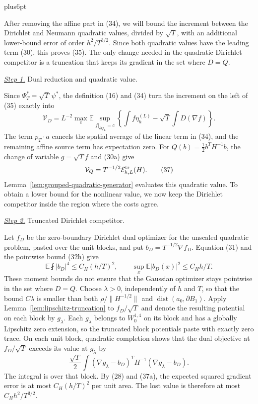\documentclass[11pt,reqno]{amsart}
\makeatletter
\theoremstyle{plain}
\theoremstyle{definition}
\theoremstyle{remark}
\renewenvironment{proof}[1][\proofname]{%
  \par
  \pushQED{\qed}%
  \normalfont
  \topsep6pt plus6pt\relax
  \trivlist
  \item[\hskip\labelsep\slshape #1\@addpunct{.}]%
  \ignorespaces
}{%
  \popQED
  \endtrivlist
  \@endpefalse
}
\DeclareRobustCommand{\qed}{%
  \leavevmode\unskip\penalty9999\hbox{}\nobreak
  \ifmmode
    \makebox[0pt][l]{\qquad\hbox{\qedsymbol}}%
  \else
    \qquad\hbox{\qedsymbol}%
  \fi
}
\renewcommand{\qedsymbol}{\rule[.47pt]{4pt}{6pt}}
\numberwithin{equation}{section}
\newcommand{\1}{\mathbf 1}
\makeatother
\begin{document}
\begin{proof}
After removing the affine part in (34), we will bound the increment
between the Dirichlet and Neumann quadratic values, divided by
$\sqrt T$, with an additional lower-bound error of order
$h^2/T^{3/2}$.  Since both quadratic values have the leading term
(30), this proves (35).  The only change needed in the quadratic
Dirichlet competitor is a truncation that keeps its gradient in the
set where $D=Q$.

\smallskip\noindent
\underline{\textit{Step 1.}} Dual reduction and quadratic value.

Since $\Psi_ T^*=\sqrt T\,\psi^*$, the definition (16) and (34) turn
the increment on the left of (35) exactly into
\begin{equation}
\mathcal V_ D=L^{-2}\max_ c\mathbb E\sup_ {f|_ {\partial Q_ L}=c}
\left\{\int f\eta_ h^{(L)}-\sqrt T\int D(\nabla f)\right\}.
\tag{36}
\end{equation}
The term $p_ T\cdot a$ cancels the spatial average of the linear term
in (34), and the remaining affine source term has expectation zero.  For
$Q(b)=\frac12b^TH^{-1}b$, the change of variable
$g=\sqrt T f$ and (30a) give
\begin{equation}
\mathcal V_ Q=T^{-1/2}\mathcal E^{\rm tr}_ {h,L}(H).
\tag{37}
\end{equation}
Lemma~\ref{lem:grouped-quadratic-generator} evaluates this quadratic
value.  To obtain a lower bound for the nonlinear value, we now keep
the Dirichlet competitor inside the region where the costs agree.

\smallskip\noindent
\underline{\textit{Step 2.}} Truncated Dirichlet competitor.

Let $f_D$ be the zero-boundary Dirichlet dual optimizer for the
unscaled quadratic problem, pasted over the unit blocks, and put
$b_D=T^{-1/2}\nabla f_D$.  Equation (31) and the pointwise bound
(32h) give
\begin{equation}
\mathbb E\fint|b_ D|^4\leq C_ H(h/T)^2,\qquad
\sup_ x\mathbb E|b_ D(x)|^2\leq C_ Hh/T.
\tag{37a}
\end{equation}
These moment bounds do not ensure that the Gaussian optimizer stays
pointwise in the set where $D=Q$.  Choose $\lambda>0$, independently
of $h$ and $T$, so that the bound $C\lambda$ is smaller than both
$\rho/\|H^{-1/2}\|$ and
$\operatorname {dist}(a_ 0,\partial B_ 1)$.  Apply
Lemma~\ref{lem:lipschitz-truncation} to $f_D/\sqrt T$ and denote the
resulting potential on each block by $g_\lambda$.  Each $g_\lambda$
belongs to $W^{1,4}_0$ on its block and has a globally Lipschitz zero
extension, so the truncated block potentials paste with exactly zero
trace.  On each unit block,
quadratic completion shows that the dual objective at
$f_D/\sqrt T$ exceeds its value at $g_\lambda$ by
\begin{equation*}
\frac{\sqrt T}{2}\int
(\nabla g_\lambda-b_D)^TH^{-1}(\nabla g_\lambda-b_D).
\end{equation*}
The integral is over that block.
By (28) and (37a), the expected squared gradient error is at most
$C_H(h/T)^2$ per unit area.  The lost value is therefore at most
$C_Hh^2/T^{3/2}$.


\end{proof}
\end{document}
